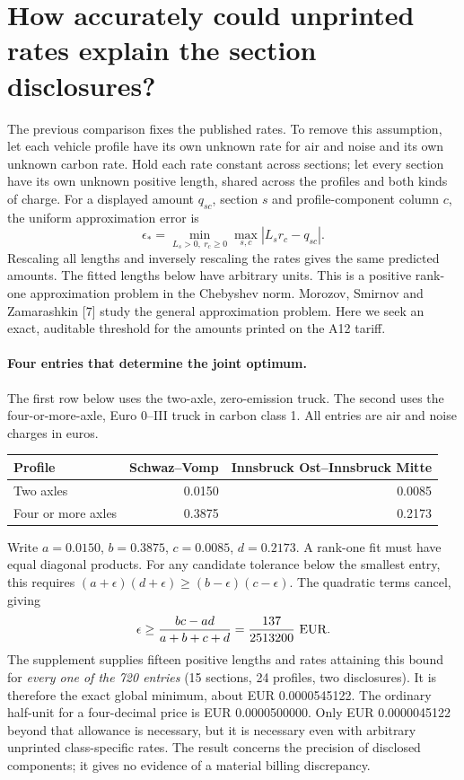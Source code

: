 \documentclass[11pt]{article}
\begin{document}
\section{How accurately could unprinted rates explain the section disclosures?}
The previous comparison fixes the published rates. To remove this assumption, let each vehicle profile have its own unknown rate for air and noise and its own unknown carbon rate. Hold each rate constant across sections; let every section have its own unknown positive length, shared across the profiles and both kinds of charge. For a displayed amount $q_{sc}$, section $s$ and profile-component column $c$, the uniform approximation error is
\[
\epsilon_*=\min_{L_s>0,\ r_c\geq0}\max_{s,c}|L_s r_c-q_{sc}|.
\]
Rescaling all lengths and inversely rescaling the rates gives the same predicted amounts. The fitted lengths below have arbitrary units. This is a positive rank-one approximation problem in the Chebyshev norm. Morozov, Smirnov and Zamarashkin [7] study the general approximation problem. Here we seek an exact, auditable threshold for the amounts printed on the A12 tariff.

\paragraph{Four entries that determine the joint optimum.}
The first row below uses the two-axle, zero-emission truck. The second uses the four-or-more-axle, Euro 0--III truck in carbon class 1. All entries are air and noise charges in euros.
\begin{center}
\begin{tabular}{lrr}
\toprule
Profile & Schwaz--Vomp & Innsbruck Ost--Innsbruck Mitte\\
\midrule
Two axles & 0.0150 & 0.0085\\
Four or more axles & 0.3875 & 0.2173\\
\bottomrule
\end{tabular}
\end{center}
Write $a=0.0150$, $b=0.3875$, $c=0.0085$, $d=0.2173$. A rank-one fit must have equal diagonal products. For any candidate tolerance below the smallest entry, this requires $(a+\epsilon)(d+\epsilon)\geq(b-\epsilon)(c-\epsilon)$. The quadratic terms cancel, giving
\[
\epsilon\geq \frac{bc-ad}{a+b+c+d}=\frac{137}{2513200}\ {\rm EUR}.
\]
The supplement supplies fifteen positive lengths and rates attaining this bound for \emph{every one of the 720 entries} (15 sections, 24 profiles, two disclosures). It is therefore the exact global minimum, about EUR 0.0000545122. The ordinary half-unit for a four-decimal price is EUR 0.0000500000. Only EUR 0.0000045122 beyond that allowance is necessary, but it is necessary even with arbitrary unprinted class-specific rates. The result concerns the precision of disclosed components; it gives no evidence of a material billing discrepancy.
\end{document}
